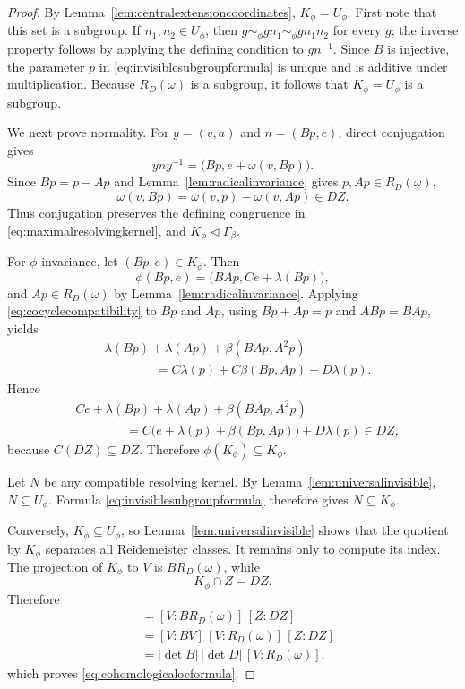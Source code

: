 \documentclass[11pt]{article}
\begin{document}
\begin{proof}
By Lemma~\ref{lem:centralextensioncoordinates}, $K_\phi=U_\phi$.  First note that this set is a subgroup.  If $n_1,n_2\in U_\phi$, then
$g\sim_\phi gn_1\sim_\phi gn_1n_2$ for every $g$; the inverse property follows
by applying the defining condition to $gn^{-1}$.  Since $B$ is injective, the
parameter $p$ in \eqref{eq:invisiblesubgroupformula} is unique and is additive
under multiplication.  Because $R_D(\omega)$ is a subgroup, it follows that
$K_\phi=U_\phi$ is a subgroup.

We next prove normality.  For $y=(v,a)$ and $n=(Bp,e)$, direct conjugation
gives
\[
  yny^{-1}=\bigl(Bp,e+\omega(v,Bp)\bigr).
\]
Since $Bp=p-Ap$ and Lemma~\ref{lem:radicalinvariance} gives $p,Ap\in R_D(\omega)$,
\[
  \omega(v,Bp)=\omega(v,p)-\omega(v,Ap)\in DZ.
\]
Thus conjugation preserves the defining congruence in
\eqref{eq:maximalresolvingkernel}, and $K_\phi\triangleleft\Gamma_\beta$.

For $\phi$-invariance, let $(Bp,e)\in K_\phi$.  Then
\[
  \phi(Bp,e)=\bigl(BAp,Ce+\lambda(Bp)\bigr),
\]
and $Ap\in R_D(\omega)$ by Lemma~\ref{lem:radicalinvariance}.  Applying
\eqref{eq:cocyclecompatibility} to $Bp$ and $Ap$, using
$Bp+Ap=p$ and $ABp=BAp$, yields
\begin{align*}
 &\lambda(Bp)+\lambda(Ap)+\beta(BAp,A^2p)\\
 &\hspace{4em}=C\lambda(p)+C\beta(Bp,Ap)+D\lambda(p).
\end{align*}
Hence
\begin{align*}
 &Ce+\lambda(Bp)+\lambda(Ap)+\beta(BAp,A^2p)\\
 &\hspace{4em}=C\bigl(e+\lambda(p)+\beta(Bp,Ap)\bigr)+D\lambda(p)
 \in DZ,
\end{align*}
because $C(DZ)\subseteq DZ$.  Therefore
$\phi(K_\phi)\subseteq K_\phi$.

Let $N$ be any compatible resolving kernel.  By
Lemma~\ref{lem:universalinvisible}, $N\subseteq U_\phi$.  Formula
\eqref{eq:invisiblesubgroupformula} therefore gives $N\subseteq K_\phi$.

Conversely, $K_\phi\subseteq U_\phi$, so
Lemma~\ref{lem:universalinvisible} shows that the quotient by $K_\phi$
separates all Reidemeister classes.  It remains only to compute its index.
The projection of $K_\phi$ to $V$ is $BR_D(\omega)$, while
\[
  K_\phi\cap Z=DZ.
\]
Therefore
\begin{align*}
  [\Gamma_\beta:K_\phi]
  &=[V:BR_D(\omega)]\,[Z:DZ]\\
  &=[V:BV]\,[V:R_D(\omega)]\,[Z:DZ]\\
  &=|\det B|\,|\det D|\,[V:R_D(\omega)],
\end{align*}
which proves \eqref{eq:cohomologicalocformula}.


\end{proof}
\end{document}

